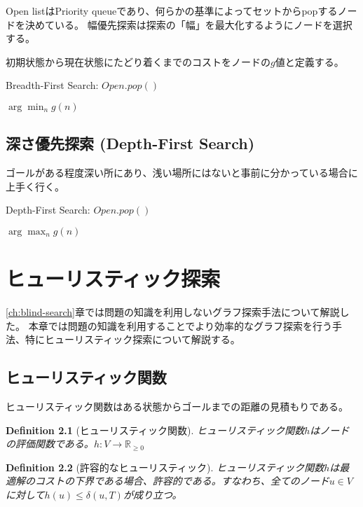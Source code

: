 \documentclass{book}
\newtheorem{definition}{Definition}
\begin{document}
Open listはPriority queueであり、何らかの基準によってセットからpopするノードを決めている。
幅優先探索は探索の「幅」を最大化するようにノードを選択する。

初期状態から現在状態にたどり着くまでのコストをノードの$g$値と定義する。

\begin{algorithm}
\caption{Breadth-First Search: $Open.pop()$}
\label{alg:brfs-open}
	\Return $\arg \min_n g(n)$
\end{algorithm}

\section{深さ優先探索 (Depth-First Search)}
ゴールがある程度深い所にあり、浅い場所にはないと事前に分かっている場合に上手く行く。


\begin{algorithm}
\caption{Depth-First Search: $Open.pop()$}
\label{alg:dfs-open}
	\Return $\arg \max_n g(n)$
\end{algorithm}




\chapter{ヒューリスティック探索}
\ref{ch:blind-search}章では問題の知識を利用しないグラフ探索手法について解説した。
本章では問題の知識を利用することでより効率的なグラフ探索を行う手法、特にヒューリスティック探索について解説する。

\section{ヒューリスティック関数}
ヒューリスティック関数はある状態からゴールまでの距離の見積もりである。

\begin{definition}[ヒューリスティック関数]
ヒューリスティック関数$h$はノードの評価関数である。$h: V \rightarrow \mathbb{R}_{\geq 0}$
\end{definition}

\begin{definition}[許容的なヒューリスティック]
ヒューリスティック関数$h$は最適解のコストの下界である場合、許容的である。すなわち、全てのノード$u \in V$に対して$h(u) \leq \delta(u, T)$が成り立つ。
\end{definition}
\end{document}
